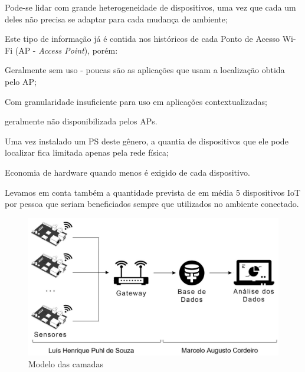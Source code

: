 \documentclass[
	12pt,				%
	openright,			%
	oneside,			%
	a4paper,			%
	chapter=TITLE,		%
	english,			%
	french,				%
	spanish,			%
	brazil				%
	]{abntex2}
\begin{document}
{\begin{alineas}
	\item Pode-se lidar com grande heterogeneidade de dispositivos, uma vez
que cada um deles não precisa se adaptar para cada mudança de ambiente;

	\item Este tipo de informação já é contida nos históricos de cada Ponto de
	Acesso Wi-Fi (AP - \textit{Access Point}), porém:

	\begin{alineas}

		\item Geralmente sem uso - poucas são as aplicações que usam a
		localização obtida pelo AP;

		\item Com granularidade insuficiente para uso em aplicações
		contextualizadas;

		\item geralmente não disponibilizada pelos APs.

	\end{alineas}

	\item Uma vez instalado um PS deste gênero, a quantia de dispositivos que
	ele pode localizar fica limitada apenas pela rede física;

	\item Economia de hardware quando menos é exigido de cada dispositivo.

\end{alineas}

Levamos em conta também a quantidade prevista de em média 5 dispositivos IoT
por pessoa que seriam beneficiados sempre que utilizados no ambiente conectado.

\begin{figure}[htb]
	\caption{\label{fig:projeto}Modelo das camadas }
	\begin{center}
		\includegraphics[width=1\textwidth]{img/projeto.JPG}
	\end{center}
\end{figure}

}
\end{document}
